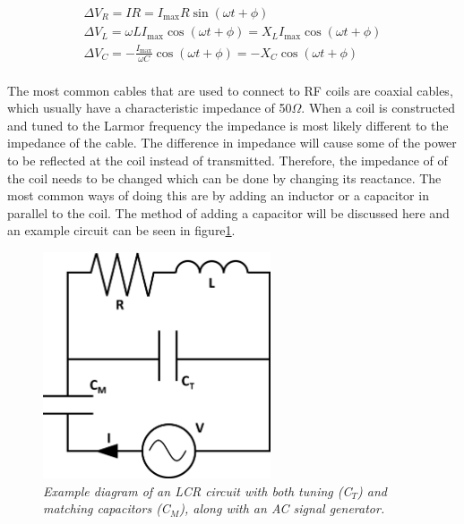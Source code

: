 \begin{equation}
\begin{gathered}
    \Delta V_R = IR = I_{\mathrm{max}}R\sin(\omega t + \phi) \\
    \Delta V_L = \omega LI_{\mathrm{max}}\cos(\omega t + \phi) =  X_LI_{\mathrm{max}}\cos(\omega t + \phi)\\
    \Delta V_C = -\frac{I_{\mathrm{max}}}{\omega C}\cos(\omega t + \phi) = -X_C\cos(\omega t + \phi)\\
    \label{eqn:theory:Voltage}
\end{gathered}
\end{equation}

The most common cables that are used to connect to \ac{RF} coils are coaxial cables, which usually have a characteristic impedance of 50$\Omega$. When a coil is constructed and tuned to the Larmor frequency the impedance is most likely different to the impedance of the cable. The difference in impedance will cause some of the power to be reflected at the coil instead of transmitted. Therefore, the impedance of of the coil needs to be changed which can be done by changing its reactance. The most common ways of doing this are by adding an inductor or a capacitor in parallel to the coil. The method of adding a capacitor will be discussed here and an example circuit can be seen in figure\ref{fig:theory:RLC}.

\begin{figure}
    \centering
    \includegraphics[width=0.6\textwidth]{Figures/Theory/RLC_Circuit.png}
    \caption{\textit{Example diagram of an LCR circuit with both tuning (C$_T$) and matching capacitors (C$_M$), along with an AC signal generator.}}
    \label{fig:theory:RLC}
\end{figure}

